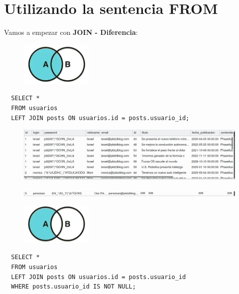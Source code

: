 \documentclass{article}
\begin{document}
\section{Utilizando la sentencia FROM}%
Vamos a empezar con \textbf{JOIN - Diferencia}:

\begin{figure}[h!]
  \centering
  \includegraphics[scale=0.75]{./Pictures/089_join_left.png}
\end{figure}

\begin{verbatim}
  SELECT *
  FROM usuarios
  LEFT JOIN posts ON usuarios.id = posts.usuario_id;
\end{verbatim}

\begin{figure}[h!]
  \centering
  \includegraphics[scale=0.55]{./Pictures/087_join_left.png}
\end{figure}

\begin{figure}[h!]
  \centering
  \includegraphics[scale=0.55]{./Pictures/088_join_left_perezoso.png}
\end{figure}

\begin{figure}[h!]
  \centering
  \includegraphics[scale=0.75]{./Pictures/090_join_left_not_null.png}
\end{figure}

\begin{verbatim}
  SELECT *
  FROM usuarios
  LEFT JOIN posts ON usuarios.id = posts.usuario_id
  WHERE posts.usuario_id IS NOT NULL;
\end{verbatim}
\end{document}
